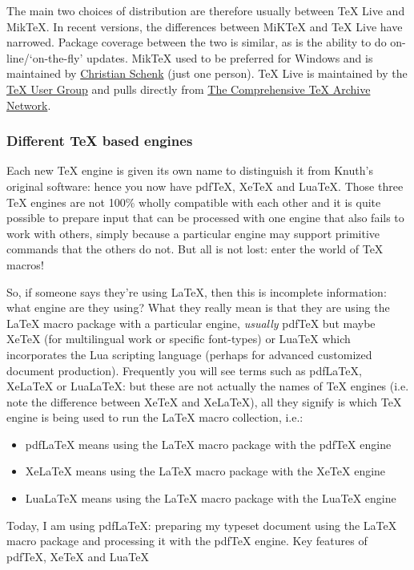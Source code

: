 \documentclass[a4paper, 12pt]{article}
\begin{document}
The main two choices of distribution are therefore usually between TeX Live and MikTeX. In recent versions, the differences between MiKTeX and TeX Live have narrowed. Package coverage between the two is similar, as is the ability to do on-line/`on-the-fly' updates. MikTeX used to be preferred for Windows and is maintained by \href{https://tug.org/interviews/schenk.html}{Christian Schenk} (just one person). TeX Live is maintained by the \href{https://tug.org/}{TeX User Group} and pulls directly from \href{https://ctan.org/}{The Comprehensive TeX Archive Network}.

\subsubsection{Different \TeX{} based engines}

Each new \TeX{} engine is given its own name to distinguish it from Knuth’s original software: hence you now have pdfTeX, XeTeX and LuaTeX. Those three \TeX{} engines are not 100\% wholly compatible with each other and it is quite possible to prepare input that can be processed with one engine that also fails to work with others, simply because a particular engine may support primitive commands that the others do not. But all is not lost: enter the world of \TeX{} macros!

So, if someone says they're using \LaTeX{}, then this is incomplete information: what engine are they using? What they really mean is that they are using the \LaTeX{} macro package with a particular engine, \emph{usually} pdfTeX but maybe XeTeX (for multilingual work or specific font-types) or LuaTeX which incorporates the Lua scripting language (perhaps for advanced customized document production). Frequently you will see terms such as pdfLaTeX, XeLaTeX or LuaLaTeX: but these are not actually the names of \TeX{} engines (i.e. note the difference between XeTeX and XeLaTeX), all they signify is which \TeX{} engine is being used to run the \LaTeX{} macro collection, i.e.:

\begin{itemize}
\item pdfLaTeX means using the LaTeX macro package with the pdfTeX engine
\item XeLaTeX means using the LaTeX macro package with the XeTeX engine
\item LuaLaTeX means using the LaTeX macro package with the LuaTeX engine
\end{itemize}

Today, I am using pdfLaTeX: preparing my typeset document using the \LaTeX{} macro package and processing it with the pdfTeX engine. Key features of pdfTeX, XeTeX and LuaTeX
\end{document}
